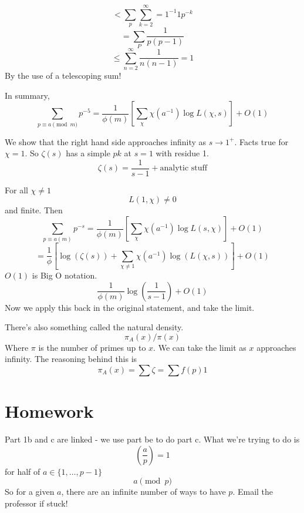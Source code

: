 \documentclass{article}
\begin{document}
\[ < \sum_p \sum_{k = 2}^{\infty} = 1^{-1} 1 p^{-k} \]
\[ = \sum_P{ \frac{1}{p(p-1)} } \]
\[ \leq \sum_{n = 2}^{\infty} \frac{1}{n(n-1)} = 1 \]
By the use of a telescoping sum! 

In summary, 
\[ \sum_{p \equiv a \pmod{m}} p^{-5} = \frac{1}{\phi(m)} \left[ \sum_{\chi}
\chi(a^{-1})\log L(\chi,s) \right] + O(1) \]

We show that the right hand side approaches infinity as $s \rightarrow 1^{+}$.
Facts true for $\chi = 1$. So $\zeta(s)$ has a simple $pk$ at $s = 1$ with
residue 1. 
\[ \zeta(s) = \frac{1}{s-1} + \text{analytic stuff} \] 

For all $\chi \neq 1 $ 
\[ L(1, \chi) \neq 0 \]
and finite. Then
\[ \sum_{p \equiv a(m)} p^{-s} = \frac{1}{\phi(m)} \left[ \sum_{\chi}
\chi(a^{-1}) \log L(s, \chi) \right] + O(1) \]
\[  = \frac{1}{\phi} \left[ \log(\zeta(s)) + \sum_{\chi \neq 1}
\chi(a^{-1})\log(L(\chi,s)) \right] + O(1) \]
$O(1)$ is Big O notation. 
\[ \frac{1}{\phi(m)} \log\left(\frac{1}{s-1}\right) + O(1) \]
Now we apply this back in the original statement, and take the limit. 

There's also something called the natural density. 
\[ \pi_A(x) / \pi(x) \]
Where $\pi$ is the number of primes up to $x$. We can take the limit as $x$
approaches infinity. The reasoning behind this is 
\[ \pi_A(x) = \sum \zeta = \sum f(p)1 \]

\section{Homework}
Part 1b and c are linked - we use part be to do part c. What we're trying to do
is 
\[ \left(\frac{a}{p}\right) = 1 \]
for half of $a \in \{1, \ldots, p-1\}$
\[ a \pmod p \]
So for a given $a$, there are an infinite number of ways to have $p$. Email the
professor if stuck!
\end{document}
